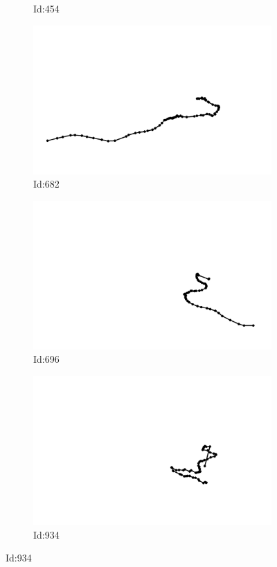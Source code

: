 \documentclass[12pt,twoside]{report}
\begin{document}
\begin{figure}
\begin{subfigure}[b]{0.20\textwidth}
\caption{Id:454}
\end{subfigure}
\begin{subfigure}[b]{0.20\textwidth}
\centering
\includegraphics[width=\textwidth]{../../trajectories/682.png}
\caption{Id:682}
\end{subfigure}
\begin{subfigure}[b]{0.20\textwidth}
\centering
\includegraphics[width=\textwidth]{../../trajectories/696.png}
\caption{Id:696}
\end{subfigure}
\begin{subfigure}[b]{0.20\textwidth}
\centering
\includegraphics[width=\textwidth]{../../trajectories/934.png}
\caption{Id:934}
\end{subfigure}
\end{figure}
\end{document}

